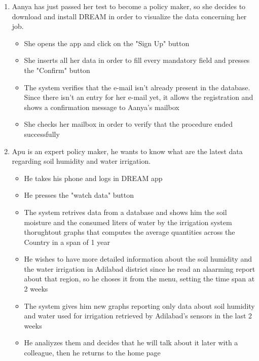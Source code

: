 \documentclass[table, 12pt]{article}
\begin{document}
\begin{enumerate}

    \item Aanya has just passed her test to become a policy maker, so she decides to download and install DREAM in order to visualize the data concerning her job.
    \begin{itemize}
        \item She opens the app and click on the "Sign Up" button
        \item She inserts all her data in order to fill every mandatory field and presses the "Confirm" button
        \item The system verifies that the e-mail isn't already present in the database. Since there isn't an entry for her e-mail yet, it allows the registration and shows a confirmation message to Aanya's mailbox
        \item She checks her mailbox in order to verify that the procedure ended successfully
    \end{itemize}

    \item Apu is an expert policy maker, he wants to know what are the latest data regarding soil humidity and water irrigation.
    \begin{itemize}
        \item He takes his phone and logs in DREAM app 
        \item He presses the "watch data" button
        \item The system retrives data from a database and shows him the soil moisture and the consumed liters of water by the irrigation system thorughtout graphs that computes the average quantities across the Country in a span of 1 year
        \item He wishes to have more detailed information about the soil humidity and the water irrigation in Adilabad district since he read an alaarming report about that region, so he choses it from the menu, setting the time span at 2 weeks
        \item The system gives him new graphs reporting only data about soil humidity and water used for irrigation retrieved by Adilabad's sensors in the last 2 weeks
        \item He analiyzes them and decides that he will talk about it later with a colleague, then he returns to the home page
    \end{itemize} 


\end{enumerate}
\end{document}

